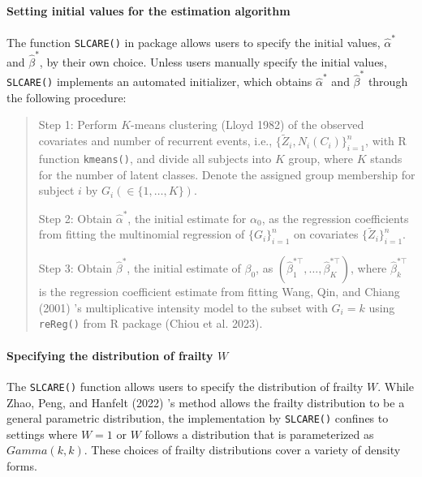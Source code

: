 \hypertarget{setting-initial-values-for-the-estimation-algorithm}{%
\paragraph{Setting initial values for the estimation algorithm}\label{setting-initial-values-for-the-estimation-algorithm}}

The function \texttt{SLCARE()} in package  allows users to specify the initial values, \(\hat\alpha^*\) and \(\hat\beta^*\), by their own choice. Unless users manually specify the initial values,
\texttt{SLCARE()} implements an automated initializer, which obtains \(\hat\alpha^*\) and \(\hat\beta^*\) through the following procedure:

\begin{quote}
Step 1: Perform \(K\)-means clustering (Lloyd 1982) of the observed covariates and number of recurrent events, i.e., \(\{\tilde Z_i, N_i(C_i)\}_{i=1}^n\), with R function \texttt{kmeans()}, and divide all subjects into \(K\) group, where \(K\) stands for the number of latent classes. Denote the assigned group membership for subject \(i\) by \(G_i (\in\{1,\ldots, K\})\).

Step 2: Obtain \(\hat\alpha^*\), the initial estimate for \(\alpha _0\), as the regression coefficients from fitting the
multinomial regression of \(\{G_i\}_{i=1}^n\) on covariates \(\{\tilde{Z}_i\}_{i=1}^n\).

Step 3: Obtain \(\hat\beta^*\), the initial estimate of \(\beta _0\), as \((\hat\beta_1^{*\top},\ldots, \hat\beta_K^{*\top})\), where \(\hat\beta_k^{*\top}\) is the regression coefficient estimate from fitting Wang, Qin, and Chiang (2001) 's multiplicative intensity model to the subset with \(G_i=k\) using \texttt{reReg()} from R package  (Chiou et al. 2023).
\end{quote}

\hypertarget{specifying-the-distribution-of-frailty-w}{%
\paragraph{\texorpdfstring{Specifying the distribution of frailty \(W\)}{Specifying the distribution of frailty W}}\label{specifying-the-distribution-of-frailty-w}}

The \texttt{SLCARE()} function allows users to specify the distribution of frailty \(W\). While Zhao, Peng, and Hanfelt (2022) 's method allows the frailty distribution to be a general parametric distribution, the implementation by \texttt{SLCARE()} confines to settings where \(W=1\) or \(W\) follows a distribution that is parameterized as \(Gamma(k, k)\). These choices of frailty distributions cover a variety of density forms.

